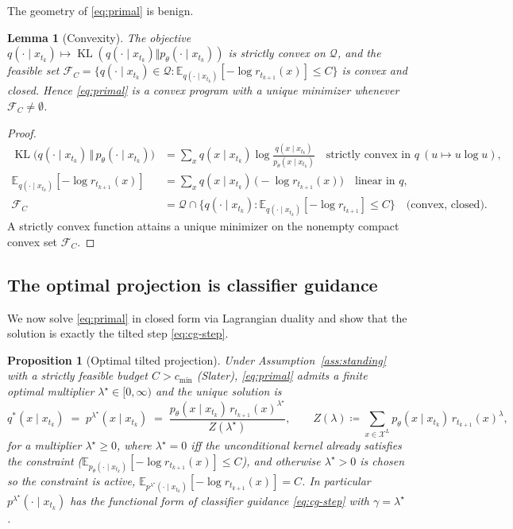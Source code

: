 \documentclass{article}
\newtheorem{proposition}{Proposition}
\newtheorem{lemma}{Lemma}
\DeclareMathOperator{\KL}{KL}
\newcommand{\E}{\mathbb{E}}
\newcommand{\X}{\mathcal{X}}
\newcommand{\Q}{\mathcal{Q}}
\newcommand{\lstar}{\lambda^{\star}}
\begin{document}
The geometry of \eqref{eq:primal} is benign.

\begin{lemma}[Convexity]
\label{lem:convex}
The objective $q(\cdot\mid x_{t_k})\mapsto\KL(q(\cdot\mid x_{t_k})\Vert p_\theta(\cdot\mid x_{t_k}))$ is strictly convex on $\Q$, and the feasible set
$\mathcal{F}_C=\{q(\cdot\mid x_{t_k})\in\Q:\E_{q(\cdot\mid x_{t_k})}[-\log r_{t_{k+1}}(x)]\le C\}$ is convex and closed. Hence \eqref{eq:primal} is a convex program with a unique minimizer whenever $\mathcal{F}_C\neq\emptyset$.
\end{lemma}
\begin{proof}
\begin{align*}
\KL\big(q(\cdot\mid x_{t_k})\,\Vert\,p_\theta(\cdot\mid x_{t_k})\big)
  &=\sum_x q(x\mid x_{t_k})\log\frac{q(x\mid x_{t_k})}{p_\theta(x\mid x_{t_k})}
   \quad\text{strictly convex in }q\ (u\mapsto u\log u),\\
\E_{q(\cdot\mid x_{t_k})}[-\log r_{t_{k+1}}(x)]
  &=\sum_x q(x\mid x_{t_k})\,\big(-\log r_{t_{k+1}}(x)\big)
   \quad\text{linear in }q,\\
\mathcal{F}_C
  &=\Q\cap\big\{q(\cdot\mid x_{t_k}):\E_{q(\cdot\mid x_{t_k})}[-\log r_{t_{k+1}}]\le C\big\}
   \quad\text{(convex, closed)}.
\end{align*}
A strictly convex function attains a unique minimizer on the nonempty compact convex set $\mathcal{F}_C$.
\end{proof}

\subsection{The optimal projection is classifier guidance}
We now solve \eqref{eq:primal} in closed form via Lagrangian duality and show that the solution is exactly the tilted step \eqref{eq:cg-step}.

\begin{proposition}[Optimal tilted projection]
\label{prop:tilt}
Under Assumption~\ref{ass:standing} with a strictly feasible budget $C>c_{\min}$ (Slater), \eqref{eq:primal} admits a finite optimal multiplier $\lstar\in[0,\infty)$ and the unique solution is
\begin{equation}
\label{eq:qlam}
q^{*}(x\mid x_{t_k})\;=\;p^{\lstar}(x\mid x_{t_k})\;=\;\frac{p_\theta(x\mid x_{t_k})\,r_{t_{k+1}}(x)^{\lstar}}{Z(\lstar)},
\qquad
Z(\lambda)\coloneqq\sum_{x\in\X^L}p_\theta(x\mid x_{t_k})\,r_{t_{k+1}}(x)^{\lambda},
\end{equation}
for a multiplier $\lstar\ge 0$, where $\lstar=0$ iff the unconditional kernel already satisfies the constraint ($\E_{p_\theta(\cdot\mid x_{t_k})}[-\log r_{t_{k+1}}(x)]\le C$), and otherwise $\lstar>0$ is chosen so the constraint is active, $\E_{p^{\lstar}(\cdot\mid x_{t_k})}[-\log r_{t_{k+1}}(x)]=C$. In particular $p^{\lstar}(\cdot\mid x_{t_k})$ has the functional form of classifier guidance \eqref{eq:cg-step} with $\gamma=\lstar$.
\end{proposition}
\end{document}
